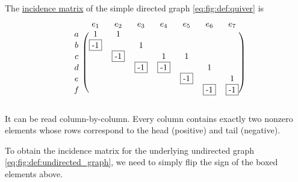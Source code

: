 \begin{example}\label{ex:quiver_matrices}
  The \hyperref[def:quiver_incidence_matrix]{incidence matrix} of the simple directed graph \eqref{eq:fig:def:quiver} is
  \begin{equation}\label{ex:quiver_matrices/incidence}
    \begin{blockarray}{cccccccc}
        & e_1       & e_2       & e_3       & e_4       & e_5       & e_6       & e_7       \\
      \begin{block}{c(ccccccc)}
      a & 1         & 1         &           &           &           &           &           \\
      b & \fbox{-1} &           & 1         &           &           &           &           \\
      c &           & \fbox{-1} &           & 1         & 1         &           &           \\
      d &           &           & \fbox{-1} & \fbox{-1} &           & 1         &           \\
      e &           &           &           &           & \fbox{-1} &           & 1         \\
      f &           &           &           &           &           & \fbox{-1} & \fbox{-1} \\
      \end{block}
    \end{blockarray}
  \end{equation}

  It can be read column-by-column. Every column contains exactly two nonzero elements whose rows correspond to the head (positive) and tail (negative).

  To obtain the incidence matrix for the underlying undirected graph \eqref{eq:fig:def:undirected_graph}, we need to simply flip the sign of the boxed elements above.


\end{example}
